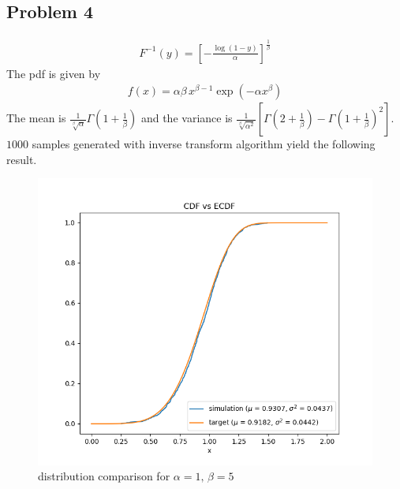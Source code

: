 \documentclass{article}
\begin{document}
\subsection*{Problem 4}
\begin{align*}
  F^{-1}(y) = \left[-\frac{\log(1-y)}{\alpha}\right]^{\frac{1}{\beta}}
\end{align*}
The pdf is given by
\begin{align*}
  f(x) = \alpha\beta\,x^{\beta-1}\exp(-\alpha x^{\beta})
\end{align*}
The mean is $\frac{1}{\sqrt[\beta]{\alpha}}\Gamma\left(1+\frac{1}{\beta}\right)$ and the variance is $\frac{1}{\sqrt[\beta]{\alpha^2}}\left[\Gamma\left(2+\frac{1}{\beta}\right)-\Gamma\left(1+\frac{1}{\beta}\right)^2\right]$.
$1000$ samples generated with inverse transform algorithm yield the following result.
\begin{figure}[h!]
    \centering
    \includegraphics[width=\linewidth]{../images/p4_1_5_1000.png}
    \caption{distribution comparison for $\alpha = 1,\,\beta = 5$}
\end{figure}
\newpage
\end{document}
